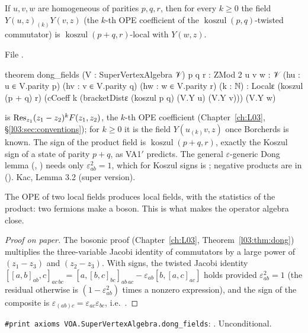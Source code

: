 \begin{theorem}\label{l17:thm:dong}
If $u,v,w$ are homogeneous of parities $p,q,r$, then for every $k\ge0$ the field
$Y(u,z)_{(k)}Y(v,z)$ (the $k$-th OPE coefficient of the $\operatorname{koszul}(p,q)$-twisted
commutator) is $\operatorname{koszul}(p+q,r)$-local with $Y(w,z)$.
\end{theorem}
\noindent File .
\begin{leancode}
theorem dong_fields (V : SuperVertexAlgebra 𝒱) {p q r : ZMod 2} {u v w : 𝒱}
    (hu : u ∈ V.parity p) (hv : v ∈ V.parity q) (hw : w ∈ V.parity r) (k : ℕ) :
    Localε (koszul (p + q) r)
      (cCoeff k (bracketDistε (koszul p q) (V.Y u) (V.Y v))) (V.Y w)
\end{leancode}
\begin{dictionary}
 is $\operatorname{Res}_{z_1}(z_1-z_2)^kF(z_1,z_2)$, the $k$-th OPE coefficient (Chapter~\ref{ch:L03},
§\ref{l03:sec:conventions}); for $k\ge0$ it is the field $Y(u_{(k)}v,z)$ once Borcherds is known.
The sign of the product field is $\operatorname{koszul}(p+q,r)$, exactly the Koszul sign of a state
of parity $p+q$, as VA1$'$ predicts. The general $\varepsilon$-generic Dong lemma
(, ) needs only
$\varepsilon_{ab}^2=1$, which for Koszul signs is ; negative products are in
 (). Kac, Lemma 3.2 (super version).
\end{dictionary}
\begin{physics}
The OPE of two local fields produces local fields, with the statistics of the product: two
fermions make a boson. This is what makes the operator algebra close.
\end{physics}
\begin{proof}[Proof on paper]
The bosonic proof (Chapter~\ref{ch:L03}, Theorem~\ref{l03:thm:dong}) multiplies the three-variable
Jacobi identity of commutators by a large power of $(z_1-z_3)$ and $(z_2-z_3)$. With signs, the
twisted Jacobi identity $[[a,b]_{ab},c]_{ac\,bc}=[a,[b,c]_{bc}]_{ab\,ac}-\varepsilon_{ab}[b,[a,c]_{ac}]$
holds provided $\varepsilon_{ab}^2=1$ (the residual otherwise is $(1-\varepsilon_{ab}^2)$ times a
nonzero expression), and the sign of the composite is
$\varepsilon_{(ab)c}=\varepsilon_{ac}\varepsilon_{bc}$, i.e.\ .
\end{proof}
\begin{status}
\texttt{\#print axioms VOA.SuperVertexAlgebra.dong\_fields}: . Unconditional.
\end{status}

